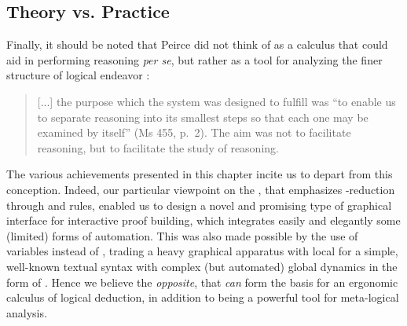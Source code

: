 \begin{scope}
\subsection{Theory vs. Practice}

Finally, it should be noted that Peirce did not think of  as a calculus that
could aid in performing reasoning \emph{per se}, but rather as a tool for
analyzing the finer structure of logical endeavor
\cite[pp.~110--111]{Roberts+1973}:
\begin{quote}
  [...] the purpose which the system was designed to fulfill was ``to enable us
to separate reasoning into its smallest steps so that each one may be examined
by itself'' (Ms 455, p.~2). The aim was not to facilitate reasoning, but to
facilitate the study of reasoning.
\end{quote}

The various achievements presented in this chapter incite us to depart from this
conception. Indeed, our particular viewpoint on the ,
that emphasizes -reduction through  and 
rules, enabled us to design a novel and promising type of graphical interface
for interactive proof building, which integrates easily and elegantly some
(limited) forms of automation. This was also made possible by the use of
variables instead of , trading a heavy graphical apparatus
with local  for a simple, well-known textual syntax with
complex (but automated) global dynamics in the form of . Hence
we believe the \emph{opposite}, that  \emph{can} form the basis for an
ergonomic calculus of logical deduction, in addition to being a powerful tool
for meta-logical analysis.


\end{scope}
